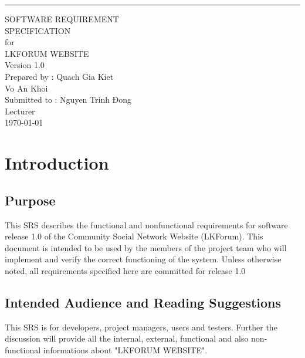 \documentclass{scrreprt}
\date{}
\def\myversion{1.0 }
\begin{document}
\begin{flushright}
    \rule{16cm}{5pt}\vskip1cm
    \begin{bfseries}
        \Huge{SOFTWARE REQUIREMENT \\ SPECIFICATION}\\
        \vspace{1.5cm}
        for\\
        \vspace{1.5cm}
        LKFORUM WEBSITE\\
        \vspace{1.5cm}
        \LARGE{Version \myversion}\\
        \vspace{1.5cm}
        Prepared by : Quach Gia Kiet\\
        Vo An Khoi\\
        \vspace{1.5cm}
        Submitted to : Nguyen Trinh Đong \\Lecturer\\
        \vspace{1.5cm}
        \today\\
    \end{bfseries}
\end{flushright}

\tableofcontents

\chapter{Introduction}

\section{Purpose}
This SRS describes the functional and nonfunctional requirements for software release 1.0 of the Community Social Network Website (LKForum). This document is intended to be used by the members of the project team who will implement and verify the correct functioning of the system. Unless otherwise noted, all requirements specified here are committed for release 1.0

\section{Intended Audience and Reading Suggestions}
This SRS is for developers, project managers, users and testers. Further the discussion will provide all the internal, external, functional and also non-functional informations about "LKFORUM WEBSITE".
\end{document}
